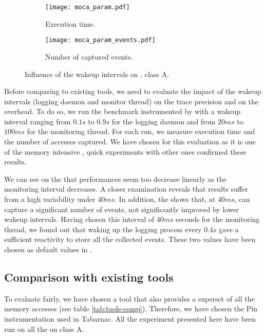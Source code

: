 \begin{figure}[htb]
    \centering
    \begin{subfigure}{\linewidth}
        \texttt{[image: moca\_param.pdf]}
        \caption{Execution time.}
        \label{fig:param_time}
    \end{subfigure}

    \begin{subfigure}{\linewidth}
        \texttt{[image: moca\_param\_events.pdf]}
        \caption{Number of captured events.}
        \label{fig:param_evts}
    \end{subfigure}
    \caption{Influence of the wakeup intervals on \IS, class A.}
    \label{fig:param}
\end{figure}

Before comparing \Moca to existing tools, we need to evaluate the impact of
the wakeup intervals (logging daemon and monitor thread) on the trace
precision and on the overhead. To do so, we run the \IS benchmark instrumented by \Moca with
a wakeup interval ranging from $0.1s$ to  $0.9s$ for the logging daemon and from $20ms$ to
$100ms$ for the monitoring thread. For each run, we measure \IS execution time and the number of
accesses captured. We have chosen \IS for this evaluation as it is one of the memory intensive \NPB,
quick experiments with other ones confirmed these results.

We can see on the  that performances seem too decrease linearly
as the monitoring interval decreases. A closer examination reveals that results
suffer from a high variability under $40ms$. 
In addition, the  shows
that, at $40ms$, \Moca can capture a significant number of events, not significantly improved
by lower wakeup intervals. Having chosen this interval of $40ms$ seconds for the monitoring thread,
we found out that waking up the logging process every $0.4s$ gave a sufficient reactivity to store
all the collected events.
These two values have been chosen as default values in \Moca.

\subsection{Comparison with existing tools}

To evaluate \Moca fairly, we have chosen a tool that also provides a superset of
all the memory accesses (see table \ref{tab:tools-comp}). Therefore, we have chosen the Pin
instrumentation used in Tabarnac. All the experiment presented here have been run on
all the \NPB on class A.

